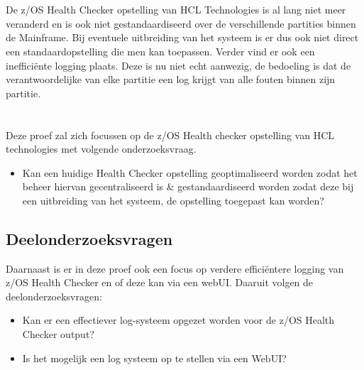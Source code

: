 \section{}
\label{sec:probleemstelling}

De z/OS Health Checker opstelling van HCL Technologies is al lang niet meer veranderd en is ook niet gestandaardiseerd over de verschillende partities binnen de Mainframe. Bij eventuele uitbreiding van het systeem is er dus ook niet direct een standaardopstelling die men kan toepassen. Verder vind er ook een inefficiënte logging plaats. Deze is nu niet echt aanwezig, de bedoeling is dat de verantwoordelijke van elke partitie een log krijgt van alle fouten binnen zijn partitie.

\section{}
\label{sec:Hoofdonderzoeksvraag}

Deze proef zal zich focussen op de z/OS Health checker opstelling van HCL technologies met volgende onderzoeksvraag.

\begin{itemize}
	\item Kan een huidige Health Checker opstelling geoptimaliseerd worden zodat het beheer hiervan gecentraliseerd is \& gestandaardiseerd worden zodat deze bij een uitbreiding van het systeem, de opstelling toegepast kan worden?
\end{itemize}

\subsection{Deelonderzoeksvragen}
\label{subsec:Deelonderzoeksvragen}

Daarnaast is er in deze proef ook een focus op verdere efficiëntere logging van z/OS Health Checker en of deze kan via een webUI. Daaruit volgen de deelonderzoeksvragen:

\begin{itemize}
	\item Kan er een effectiever log-systeem opgezet worden voor de z/OS Health Checker output?
	\item Is het mogelijk een log systeem op te stellen via een WebUI?
\end{itemize}


\section{}
\label{sec:onderzoeksdoelstelling}

